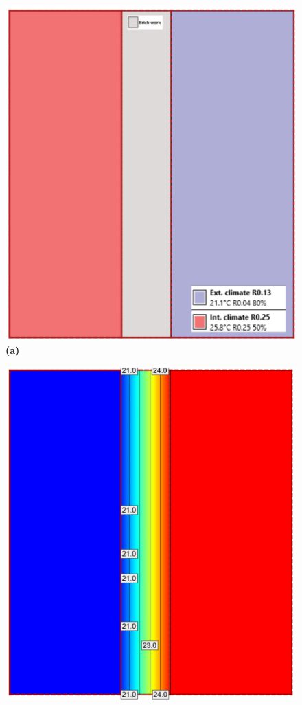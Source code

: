\begin{figure}[H]
\begin{minipage}{0.49\textwidth}
  \centering
  \includegraphics[width=\linewidth]{Figures/2dconst.png} 
  \textbf{(a)}
\end{minipage}%
\hspace{0.05\textwidth}
\begin{minipage}{0.49\textwidth}
  \centering
  \includegraphics[width=\linewidth]{Figures/2dsim.png} 

\end{minipage}
\end{figure}
